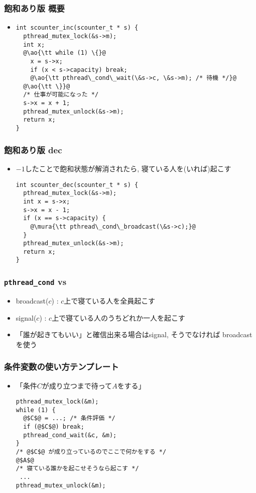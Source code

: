 \documentclass[12pt,dvipdfmx]{beamer}
\begin{document}
\begin{frame}[fragile]
  \frametitle{飽和あり版 概要}
  \begin{itemize}
  \item []
\begin{lstlisting}
int scounter_inc(scounter_t * s) {
  pthread_mutex_lock(&s->m);
  int x;
  @\ao{\tt while (1) \{}@
    x = s->x;
    if (x < s->capacity) break;
    @\ao{\tt pthread\_cond\_wait(\&s->c, \&s->m); /* 待機 */}@
  @\ao{\tt \}}@
  /* 仕事が可能になった */
  s->x = x + 1;
  pthread_mutex_unlock(&s->m);
  return x;
}
\end{lstlisting}
\end{itemize}
\end{frame}

\begin{frame}[fragile]
  \frametitle{飽和あり版 dec}
  \begin{itemize}
  \item $-1$したことで飽和状態が解消されたら,
    寝ている人を(いれば)起こす
    \begin{lstlisting}
int scounter_dec(scounter_t * s) {
  pthread_mutex_lock(&s->m);
  int x = s->x;
  s->x = x - 1;
  if (x == s->capacity) {
    @\mura{\tt pthread\_cond\_broadcast(\&s->c);}@
  }
  pthread_mutex_unlock(&s->m);
  return x;
}
    \end{lstlisting}
  \end{itemize}
\end{frame}

\begin{frame}[fragile]
  \frametitle{{\tt pthread\_cond}  vs }
  \begin{itemize}
  \item broadcast($c$) : $c$上で寝ている人を全員起こす
  \item signal($c$) : $c$上で寝ている人のうちどれか一人を起こす
  \item 「誰が起きてもいい」と確信出来る場合はsignal, そうでなければ
    broadcastを使う
  \end{itemize}

\end{frame}

\begin{frame}[fragile]
  \frametitle{条件変数の使い方テンプレート}
  \begin{itemize}
  \item 「条件$C$が成り立つまで待って$A$をする」
\begin{lstlisting}
pthread_mutex_lock(&m);
while (1) {
  @$C$@ = ...; /* 条件評価 */
  if (@$C$@) break;
  pthread_cond_wait(&c, &m);
}
/* @$C$@ が成り立っているのでここで何かをする */
@$A$@
/* 寝ている誰かを起こせそうなら起こす */
 ...
pthread_mutex_unlock(&m);      
\end{lstlisting}
\end{itemize}
\end{frame}
\end{document}
